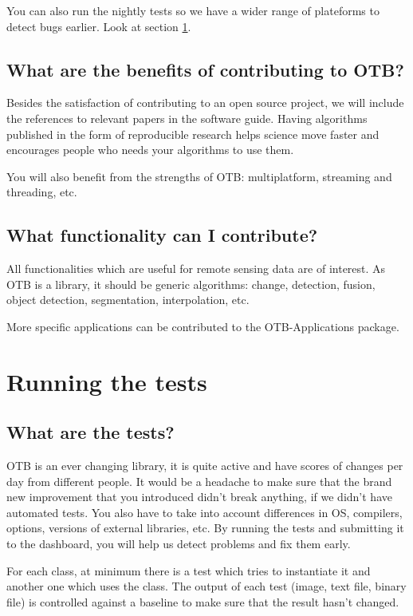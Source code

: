 You can also run the nightly tests so we have a wider range of plateforms to detect
bugs earlier. Look at section \ref{sec:runningTheTests}.

\subsection{What are the benefits of contributing to OTB?}

Besides the satisfaction of contributing to an open source project, we will include
the references to relevant papers in the software guide. Having algorithms
published in the form of reproducible research helps science move faster and
encourages people who needs your algorithms to use them.

You will also benefit from the strengths of OTB: multiplatform, streaming and
threading, etc.

\subsection{What functionality can I contribute?}

All functionalities which are useful for remote sensing data are of interest. As
OTB is a library, it should be generic algorithms: change, detection, fusion,
object detection, segmentation, interpolation, etc.

More specific applications can be contributed to the OTB-Applications package.

\section{Running the tests}\label{sec:runningTheTests}

\subsection{What are the tests?}

OTB is an ever changing library, it is quite active and have scores of
changes per day from different people. It would be a headache to make
sure that the brand new improvement that you introduced didn't break
anything, if we didn't have automated tests. You also have to take into
account differences in OS, compilers, options, versions of external
libraries, etc. By running the tests and submitting it to the dashboard,
you will help us detect problems and fix them early.

For each class, at minimum there is a test which tries to instantiate it and another one which uses the class. The output of each test (image, text file, binary file) is controlled against a baseline to make sure that the result hasn't changed.

